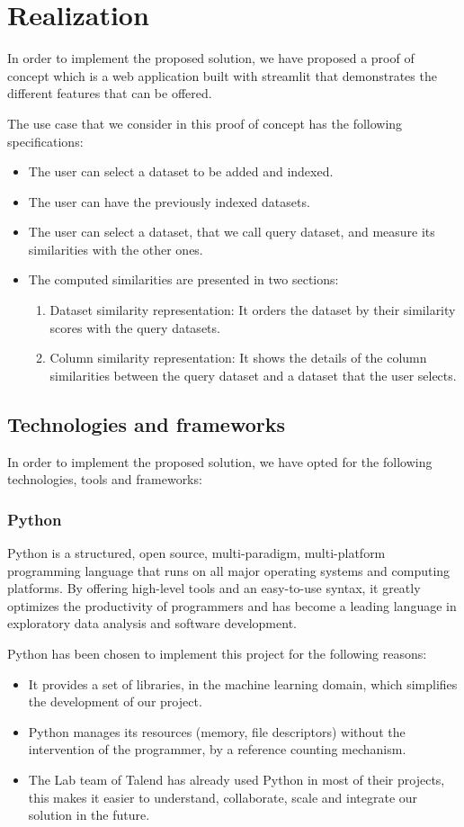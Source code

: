 \chapter{Realization}
In order to implement the proposed solution, we have proposed a proof of concept
which is a web application built with streamlit that demonstrates the different
features that can be offered.

The use case that we consider in this proof of concept has the following specifications:
\begin{itemize}
    \item The user can select a dataset to be added and indexed.
    \item The user can have the previously indexed datasets.
    \item The user can select a dataset, that we call query dataset, and measure
    its similarities with the other ones.
    \item The computed similarities are presented in two sections:
    \begin{enumerate}
        \item Dataset similarity representation: It orders the dataset by their
        similarity scores with the query datasets.
        \item Column similarity representation: It shows the details of the
        column similarities between the query dataset and a dataset that the
        user selects.
    \end{enumerate}
\end{itemize}


\section{Technologies and frameworks}
In order to implement the proposed solution, we have opted for the following
technologies, tools and frameworks:
\subsection{Python}
Python is a structured, open source, multi-paradigm, multi-platform programming
language that runs on all major operating systems and computing platforms. By
offering high-level tools and an easy-to-use syntax, it greatly optimizes the
productivity of programmers and has become a leading language in exploratory
data analysis and software development.

Python has been chosen to implement this project for the following reasons:
\begin{itemize}
    \item It provides a set of libraries, in the machine learning domain, which
    simplifies the development of our project.
    \item Python manages its resources (memory, file descriptors) without the
    intervention of the programmer, by a reference counting mechanism.
    \item The Lab team of Talend has already used Python in most of their
    projects, this makes it easier to understand, collaborate, scale and
    integrate our solution in the future.
\end{itemize}

